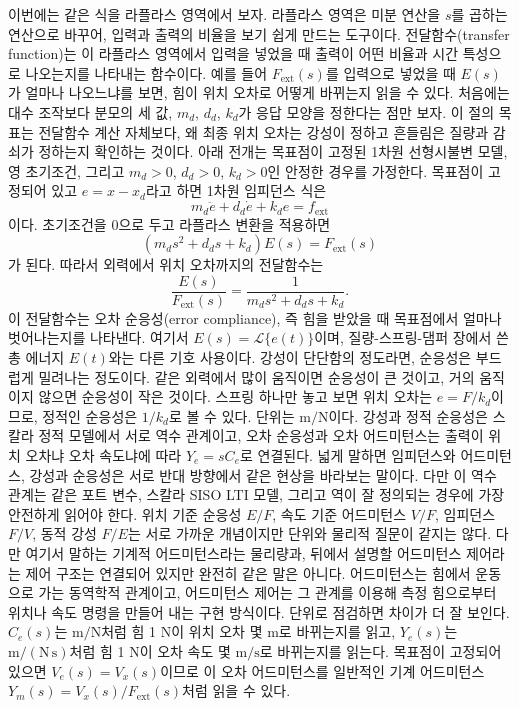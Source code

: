 이번에는 같은 식을 라플라스 영역에서 보자.
라플라스 영역은 미분 연산을 $s$를 곱하는 연산으로 바꾸어, 입력과 출력의 비율을 보기 쉽게 만드는 도구이다.
전달함수(transfer function)는 이 라플라스 영역에서 입력을 넣었을 때 출력이 어떤 비율과 시간 특성으로 나오는지를 나타내는 함수이다.
예를 들어 $F_{\mathrm{ext}}(s)$를 입력으로 넣었을 때 $E(s)$가 얼마나 나오느냐를 보면, 힘이 위치 오차로 어떻게 바뀌는지 읽을 수 있다.
처음에는 대수 조작보다 분모의 세 값, $m_d$, $d_d$, $k_d$가 응답 모양을 정한다는 점만 보자.
이 절의 목표는 전달함수 계산 자체보다, 왜 최종 위치 오차는 강성이 정하고 흔들림은 질량과 감쇠가 정하는지 확인하는 것이다.
아래 전개는 목표점이 고정된 1차원 선형시불변 모델, 영 초기조건, 그리고 $m_d>0$, $d_d>0$, $k_d>0$인 안정한 경우를 가정한다.
목표점이 고정되어 있고 $e=x-x_d$라고 하면 1차원 임피던스 식은
\begin{equation}
  m_d\ddot{e}+d_d\dot{e}+k_d e=f_{\mathrm{ext}}
  \label{eq:error_impedance_1d}
\end{equation}
이다.
초기조건을 0으로 두고 라플라스 변환을 적용하면
\begin{equation}
  (m_d s^2+d_d s+k_d)E(s)=F_{\mathrm{ext}}(s)
\end{equation}
가 된다.
따라서 외력에서 위치 오차까지의 전달함수는
\begin{equation}
  \frac{E(s)}{F_{\mathrm{ext}}(s)}
  =
  \frac{1}{m_d s^2+d_d s+k_d}.
  \label{eq:force_to_position_compliance}
\end{equation}
이 전달함수는 오차 순응성(error compliance), 즉 힘을 받았을 때 목표점에서 얼마나 벗어나는지를 나타낸다.
여기서 $E(s)=\mathcal{L}\{e(t)\}$이며, 질량-스프링-댐퍼 장에서 쓴 총 에너지 $E(t)$와는 다른 기호 사용이다.
강성이 단단함의 정도라면, 순응성은 부드럽게 밀려나는 정도이다.
같은 외력에서 많이 움직이면 순응성이 큰 것이고, 거의 움직이지 않으면 순응성이 작은 것이다.
스프링 하나만 놓고 보면 위치 오차는 $e=F/k_d$이므로, 정적인 순응성은 $1/k_d$로 볼 수 있다.
단위는 $\mathrm{m/N}$이다.
강성과 정적 순응성은 스칼라 정적 모델에서 서로 역수 관계이고, 오차 순응성과 오차 어드미턴스는 출력이 위치 오차냐 오차 속도냐에 따라 $Y_e=sC_e$로 연결된다.
넓게 말하면 임피던스와 어드미턴스, 강성과 순응성은 서로 반대 방향에서 같은 현상을 바라보는 말이다.
다만 이 역수 관계는 같은 포트 변수, 스칼라 SISO LTI 모델, 그리고 역이 잘 정의되는 경우에 가장 안전하게 읽어야 한다.
위치 기준 순응성 $E/F$, 속도 기준 어드미턴스 $V/F$, 임피던스 $F/V$, 동적 강성 $F/E$는 서로 가까운 개념이지만 단위와 물리적 질문이 같지는 않다.
다만 여기서 말하는 기계적 어드미턴스라는 물리량과, 뒤에서 설명할 어드미턴스 제어라는 제어 구조는 연결되어 있지만 완전히 같은 말은 아니다.
어드미턴스는 힘에서 운동으로 가는 동역학적 관계이고, 어드미턴스 제어는 그 관계를 이용해 측정 힘으로부터 위치나 속도 명령을 만들어 내는 구현 방식이다.
단위로 점검하면 차이가 더 잘 보인다.
$C_e(s)$는 $\mathrm{m/N}$처럼 힘 1 N이 위치 오차 몇 m로 바뀌는지를 읽고, $Y_e(s)$는 $\mathrm{m/(N\,s)}$처럼 힘 1 N이 오차 속도 몇 $\mathrm{m/s}$로 바뀌는지를 읽는다.
목표점이 고정되어 있으면 $V_e(s)=V_x(s)$이므로 이 오차 어드미턴스를 일반적인 기계 어드미턴스 $Y_m(s)=V_x(s)/F_{\mathrm{ext}}(s)$처럼 읽을 수 있다.


